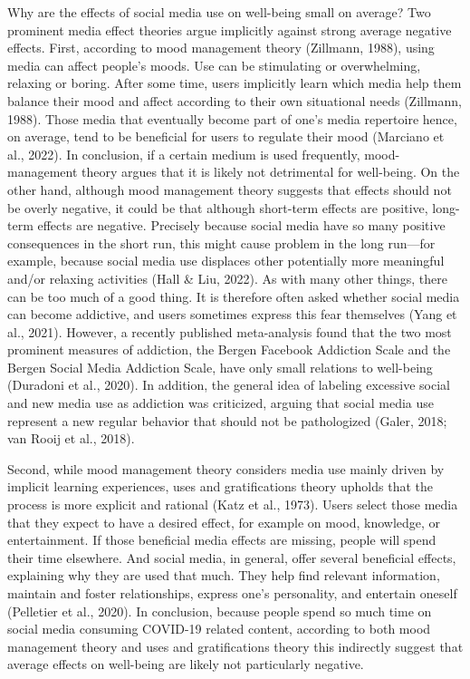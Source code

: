 \documentclass[
  man,mask,floatsintext]{apa7}
\begin{document}
Why are the effects of social media use on well-being small on average?
Two prominent media effect theories argue implicitly against strong average negative effects.
First, according to mood management theory (Zillmann, 1988), using media can affect people's moods.
Use can be stimulating or overwhelming, relaxing or boring.
After some time, users implicitly learn which media help them balance their mood and affect according to their own situational needs (Zillmann, 1988).
Those media that eventually become part of one's media repertoire hence, on average, tend to be beneficial for users to regulate their mood (Marciano et al., 2022).
In conclusion, if a certain medium is used frequently, mood-management theory argues that it is likely not detrimental for well-being.
On the other hand, although mood management theory suggests that effects should not be overly negative, it could be that although short-term effects are positive, long-term effects are negative.
Precisely because social media have so many positive consequences in the short run, this might cause problem in the long run---for example, because social media use displaces other potentially more meaningful and/or relaxing activities (Hall \& Liu, 2022).
As with many other things, there can be too much of a good thing.
It is therefore often asked whether social media can become addictive, and users sometimes express this fear themselves (Yang et al., 2021).
However, a recently published meta-analysis found that the two most prominent measures of addiction, the Bergen Facebook Addiction Scale and the Bergen Social Media Addiction Scale, have only small relations to well-being (Duradoni et al., 2020).
In addition, the general idea of labeling excessive social and new media use as addiction was criticized, arguing that social media use represent a new regular behavior that should not be pathologized (Galer, 2018; van Rooij et al., 2018).

Second, while mood management theory considers media use mainly driven by implicit learning experiences, uses and gratifications theory upholds that the process is more explicit and rational (Katz et al., 1973).
Users select those media that they expect to have a desired effect, for example on mood, knowledge, or entertainment.
If those beneficial media effects are missing, people will spend their time elsewhere.
And social media, in general, offer several beneficial effects, explaining why they are used that much.
They help find relevant information, maintain and foster relationships, express one's personality, and entertain oneself (Pelletier et al., 2020).
In conclusion, because people spend so much time on social media consuming COVID-19 related content, according to both mood management theory and uses and gratifications theory this indirectly suggest that average effects on well-being are likely not particularly negative.
\end{document}
